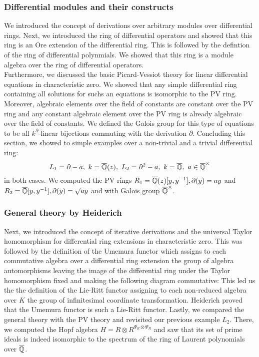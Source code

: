 \subsubsection{Differential modules and their constructs}
We introduced the concept of derivations over arbitrary modules over differential rings. Next, we introduced the ring of differential operators and showed that this ring is an Ore extension of the differential ring. This is followed by the defintion of the ring of differential polynmials. We showed that this ring is a module algebra over the ring of differential operators.\\
Furthermore, we discussed the basic Picard-Vessiot theory for linear differential equations in characteristic zero. We showed that any simple differential ring containing all solutions for suchs an equations is isomorphic to the PV ring. Moreover, algebraic elements over the field of constants are constant over the PV ring and any constant algebraic element over the PV ring is already algebraic over the field of constants. We defined the Galois group for this type of equations to be all $k^\partial$-linear bijections commuting with the derivation $\partial$. Concluding this section, we showed to simple examples over a non-trivial and a trivial differential ring:
$$L_1 = \partial - a, \ k = \overline{\mathbb{Q}}(z),\ L_2 = \partial^2 - a, \ k = \overline{\mathbb{Q}},\ a \in \overline{\mathbb{Q}}^\times$$
in both cases. We computed the PV rings $R_1 = \overline{\mathbb{Q}}(z)[y,y^{-1}], \partial(y) = a y$ and $R_2 = \overline{\mathbb{Q}}[y,y^{-1}], \partial(y) = \sqrt{a} y$ and with Galois group $\overline{\mathbb{Q}}^\times$.
\subsubsection{General theory by Heiderich}
Next, we introduced the concept of iterative derivations and the universal Taylor homomorphism for differential ring extensions in characteristic zero. This was followed by the definition of the Umemura functor which assigns to each commutative algebra over a differential ring extension the group of algebra automorphisms leaving the image of the differential ring under the Taylor homomorphism fixed and making the following diagram commutative:
This led us the the definition of the Lie-Ritt functor assigning to each non-reduced algebra over $K$ the group of infinitesimal coordinate transformation. Heiderich proved that the Umemura functor is such a Lie-Ritt functor. Lastly, we compared the general theory with the PV theory and revisited our previous example $L_2$. There, we computed the Hopf algebra $H = R \otimes R^{\Psi_R \otimes \Psi_R}$ and saw that its set of prime ideals is indeed isomorphic to the spectrum of the ring of Laurent polynomials over $\overline{\mathbb{Q}}$.
